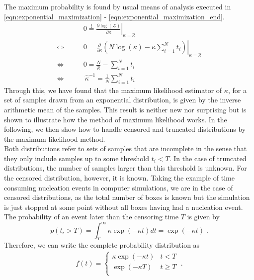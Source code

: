 The maximum probability is found by usual means of analysis executed in \autoref{eqn:exponential_maximization} - \autoref{eqn:exponential_maximization_end}.
\begin{align}
\label{eqn:exponential_maximization}
& 0 \stackrel{!}{=} \left. \frac{\partial \log (\mathcal{L})}{\partial \kappa} \right|_{\kappa=\hat{\kappa}}\\
\Leftrightarrow \qquad  &0 = \left. \frac{\partial}{\partial \kappa} \left( N \log(\kappa) - \kappa \sum_{i=1}^N t_i \right)  \right|_{\kappa=\hat{\kappa}} \\
\Leftrightarrow \qquad &0 = \frac{N}{\hat{\kappa}} - \sum_{i=1}^N t_i \\
\label{eqn:exponential_maximization_end}
\Leftrightarrow  \qquad & \!\!\!\!\!\!\!\!\: \hat{\kappa}^{-1} = \frac{1}{N} \sum_{i=1}^N t_i  
\end{align}
Through this, we have found that the maximum likelihood estimator of $\kappa$, for a set of samples drawn from an exponential distribution, is given by the inverse arithmetic mean of the samples. This result is neither new nor surprising but is shown to illustrate how the method of maximum likelihood works. In the following, we then show how to handle censored and truncated distributions by the maximum likelihood method.\\
Both distributions refer to sets of samples that are incomplete in the sense that they only include samples up to some threshold $t_i < T$. In the case of truncated distributions, the number of samples larger than this threshold is unknown. For the censored distribution, however, it is known. Taking the example of time consuming nucleation events in computer simulations, we are in the case of censored distributions, as the total number of boxes is known but the simulation is just stopped at some point without all boxes having had a nucleation event. The probability of an event later than the censoring time $T$ is given by
\begin{equation}
\label{eqn:prob_t_larger_T}
p(t_i>T) = \int_T^{\infty} \kappa \exp(-\kappa t) dt = \exp(-\kappa t) \; \text{.}
\end{equation}
Therefore, we can write the complete probability distribution as
\begin{align}
\label{eqn:pdf_censored}
f(t) = 
\begin{cases}
\kappa \exp(-\kappa t) & t < T\\
\exp(-\kappa T) & t \geq T\\ 
\end{cases} \; \text{.}
\end{align}
